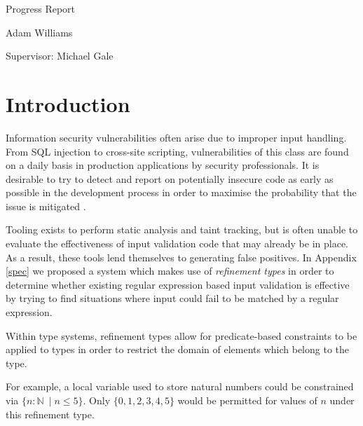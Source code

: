 \documentclass[a4paper]{article}
\begin{document}
\begin{titlepage}
    {\par}
    \vspace{1.25cm}
    \vspace{3.5cm}
    {\hspace{0.75cm}\Huge \sffamily Progress Report}
    \vspace{0.16cm}
    {\par}
    {\hspace{0.75cm}\large \sffamily Adam Williams}
    
    \vspace{0cm}
    {\par}
    {\hspace{0.75cm}\large \sffamily Supervisor: Michael Gale}
    \vfill
\end{titlepage}
\restoregeometry
\restorepagecolor

\tableofcontents
\pagebreak[5]
    
    \section{Introduction}
    
    Information security vulnerabilities often arise due to improper input handling. From SQL injection to cross-site scripting, vulnerabilities of this class are found on a daily basis in production applications by security professionals. It is desirable to try to detect and report on potentially insecure code as early as possible in the development process in order to maximise the probability that the issue is mitigated \citep{Sadowski:2018:LBS:3200906.3188720}.
    
    Tooling exists to perform static analysis and taint tracking, but is often unable to evaluate the effectiveness of input validation code that may already be in place. As a result, these tools lend themselves to generating false positives. In Appendix \ref{spec} we proposed a system which makes use of \emph{refinement types} in order to determine whether existing regular expression based input validation is effective by trying to find situations where input could fail to be matched by a regular expression.
    
    Within type systems, refinement types allow for predicate-based constraints to be applied to types in order to restrict the domain of elements which belong to the type.
    
    For example, a local variable used to store natural numbers could be constrained via $\{n: \mathbb{N}\ \mid n \leq 5\}$. Only $\{0, 1, 2, 3, 4, 5\}$ would be permitted for values of $n$ under this refinement type.
    
\end{document}
